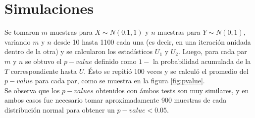 \documentclass[%
 reprint,
 amsmath,amssymb,
 aps,
spanish]{revtex4-1}
\begin{document}
\section{Simulaciones}
Se tomaron $m$ muestras para $X \sim N(0.1, 1)$ y $n$ muestras para $Y \sim N(0, 1)$, variando $m$ y $n$ desde 10 hasta 1100 cada una (es decir, en una iteración anidada dentro de la otra) y se 
calcularon los estadísticos $U_1$ y $U_2$. Luego, para cada par $m$ y $n$ se obtuvo el $p-value$ definido como $1-$ la probabilidad acumulada de la $T$ correspondiente hasta $U$. Ésto se repitió 
100 veces y se calculó el promedio del $p-value$ para cada par, como se muestra en la figura \ref{fig:pvalue}.\\
Se observa que los $p-values$ obtenidos con ámbos tests son muy similares, y en ambos casos fue necesario tomar aproximadamente 900 muestras de cada distribución normal para obtener un $p-value < 
0.05$.\\
\end{document}
